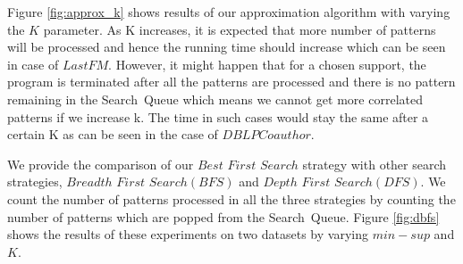 \par Figure \ref{fig:approx_k} shows results of our approximation algorithm with varying the $K$ parameter. As K increases, it is expected that more number of patterns will be processed and hence the running time should increase which can be seen in case of $LastFM$. However, it might happen that for a chosen support, the program is terminated after all the patterns are processed and there is no pattern remaining in the {\sf Search\ Queue} which means we cannot get more correlated patterns if we increase k. The time in such cases would stay the same after a certain K as can be seen in the case of $DBLP Coauthor$.





 We provide the comparison of our $Best$ $First$ $Search$ strategy with other search strategies, $Breadth$ $First$ $Search(BFS)$ and $Depth$ $First$ $Search(DFS)$. We count the number of patterns processed in all the three strategies by counting the number of patterns which are popped from the {\sf Search\ Queue}. Figure \ref{fig:dbfs} shows the results of these experiments on two datasets by varying $min-sup$ and $K$. 

